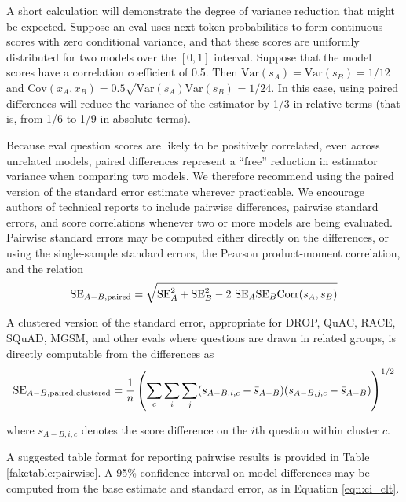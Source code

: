 \documentclass[11pt, oneside]{article}   	%
\newcommand{\Var}{\mathrm{Var}}
\newcommand{\Cov}{\mathrm{Cov}}
\newcommand{\Corr}{\mathrm{Corr}}
\newcommand{\standarderror}{\mathrm{SE}}
\begin{document}
A short calculation will demonstrate the degree of variance reduction that might be expected. Suppose an eval uses next-token probabilities to form continuous scores with zero conditional variance, and that these scores are uniformly distributed for two models over the $[0, 1]$ interval. Suppose that the model scores have a correlation coefficient of 0.5. Then $\Var(s_A)=\Var(s_B)=1/12$ and $\Cov(x_A, x_B)=0.5\sqrt{\Var(s_A)\Var(s_B)}=1/24$. In this case, using paired differences will reduce the variance of the estimator by 1/3 in relative terms (that is, from 1/6 to 1/9 in absolute terms).

Because eval question scores are likely to be positively correlated, even across unrelated models, paired differences represent a ``free'' reduction in estimator variance when comparing two models. We therefore recommend using the paired version of the standard error estimate wherever practicable. We encourage authors of technical reports to include pairwise differences, pairwise standard errors, and score correlations whenever two or more models are being evaluated. Pairwise standard errors may be computed either directly on the differences, or using the single-sample standard errors, the Pearson product-moment correlation, and the relation
\[
\standarderror_{A-B, {\rm paired}}=\sqrt{\standarderror_A^2+\standarderror_B^2-2\ \standarderror_A \standarderror_B \Corr(s_A, s_B)}
\]

A clustered version of the standard error, appropriate for DROP, QuAC, RACE, SQuAD, MGSM, and other evals where questions are drawn in related groups, is directly computable from the differences as
\begin{equation}
\standarderror_{A-B, {\rm paired}, {\rm clustered}}=\frac{1}{n}\left(\sum_c \sum_i \sum_j (s_{A-B, i, c}-\bar{s}_{A-B})(s_{A-B, j, c}-\bar{s}_{A-B})\right)^{1/2}
\end{equation}

where $s_{A-B, i, c}$ denotes the score difference on the $i$th question within cluster $c$.

A suggested table format for reporting pairwise results is provided in Table \ref{faketable:pairwise}. A 95\% confidence interval on model differences may be computed from the base estimate and standard error, as in Equation \ref{eqn:ci_clt}.
\end{document}
